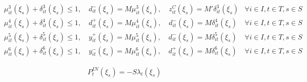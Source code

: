 \documentclass[10pt]{article}
\begin{document}
\begin{subequations}
\begin{align}
        & \mu^3_{it}(\xi_s) + \delta^{3}_{it}(\xi_s) \leq 1, \quad d^-_{it}(\xi_s) = M\mu^3_{it}(\xi_s), \quad z^C_{it}(\xi_s) = M'\delta^{3}_{it}(\xi_s) & \forall i \in I, t \in T, s \in S \\
        & \mu^4_{it}(\xi_s) + \delta^{4}_{it}(\xi_s) \leq 1, \quad d^+_{it}(\xi_s) = M\mu^4_{it}(\xi_s), \quad d^-_{it}(\xi_s) = M\delta^{4}_{it}(\xi_s) & \forall i \in I, t \in T, s \in S \\
        & \mu^5_{it}(\xi_s) + \delta^{5}_{it}(\xi_s) \leq 1, \quad y^+_{it}(\xi_s) = M\mu^5_{it}(\xi_s), \quad d^-_{it}(\xi_s) = M\delta^{5}_{it}(\xi_s) & \forall i \in I, t \in T, s \in S \\
        & \mu^6_{it}(\xi_s) + \delta^{6}_{it}(\xi_s) \leq 1, \quad y^-_{it}(\xi_s) = M\mu^6_{it}(\xi_s), \quad d^+_{it}(\xi_s) = M\delta^{6}_{it}(\xi_s) & \forall i \in I, t \in T, s \in S 
    \end{align}
\end{subequations}

\begin{align}
& P_{t}^{IN}(\xi_s) = -S\lambda_t(\xi_s)&
\end{align}
\end{document}
